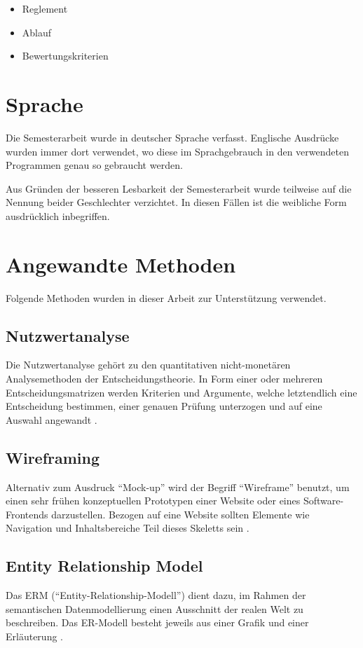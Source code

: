 \begin{itemize}
    \item Reglement \cite{hsz_reglement}
    \item Ablauf \cite{hsz_ablauf}
    \item Bewertungskriterien \cite{hsz_bewertungskriterien}
\end{itemize}

\section{Sprache}
Die Semesterarbeit wurde in deutscher Sprache verfasst. Englische Ausdrücke 
wurden immer dort verwendet, wo diese im Sprachgebrauch in den verwendeten 
Programmen genau so gebraucht werden.

Aus Gründen der besseren Lesbarkeit der Semesterarbeit wurde teilweise auf 
die Nennung beider Geschlechter verzichtet. In diesen Fällen ist die 
weibliche Form ausdrücklich inbegriffen.

\section{Angewandte Methoden}
Folgende Methoden wurden in dieser Arbeit zur Unterstützung verwendet. 

\subsection{Nutzwertanalyse}
Die Nutzwertanalyse gehört zu den quantitativen nicht-monetären Analysemethoden 
der Entscheidungstheorie. In Form einer oder mehreren 
Entscheidungsmatrizen werden Kriterien und Argumente, welche letztendlich eine 
Entscheidung bestimmen, einer genauen Prüfung unterzogen und auf eine Auswahl 
angewandt \cite{nutzwertanalyse}.

\subsection{Wireframing}
Alternativ zum Ausdruck ``Mock-up'' wird der Begriff ``Wireframe'' benutzt, um einen 
sehr frühen konzeptuellen Prototypen einer Website oder eines Software-Frontends 
darzustellen. Bezogen auf eine Website sollten Elemente wie Navigation und 
Inhaltsbereiche Teil dieses Skeletts sein \cite{wireframe}.

\subsection{Entity Relationship Model}
Das ERM (``Entity-Relationship-Modell'') dient dazu, im Rahmen der semantischen 
Datenmodellierung einen Ausschnitt der realen Welt zu beschreiben. 
Das ER-Modell besteht jeweils aus einer Grafik und einer Erläuterung \cite{erm}.